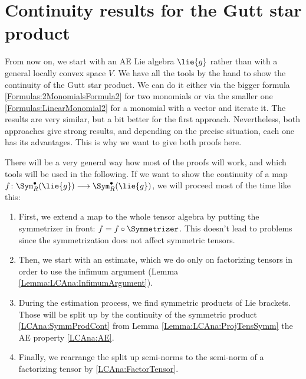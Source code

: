 \section{Continuity results for the Gutt star product}
\label{sec:chap5_TopologyStar}

From now on, we start with an AE Lie algebra $\lie{g}$ rather than with a 
general locally convex space $V$. We have all the tools by the hand to show the 
continuity of the Gutt star product. We can do it either via the bigger 
formula \eqref{Formulas:2MonomialsFormula2} for two monomials or via the 
smaller one \eqref{Formulas:LinearMonomial2} for a monomial with a 
vector and iterate it. The results are very similar, but a bit better for the 
first approach. Nevertheless, both approaches give strong results, and 
depending on the precise situation, each one has its advantages. This is why 
we want to give both proofs here.

There will be a very general way how most of the proofs will work, and which 
tools will be used in the following. If we want to show the continuity of a 
map $f \colon \Sym_R^{\bullet}(\lie{g}) \longrightarrow 
\Sym_R^{\bullet}(\lie{g})$, we will proceed most of the time like this:
\begin{enumerate}
	\item \label{Item:LCAna:Step1}
	First, we extend a map to the whole tensor algebra by putting the 
	symmetrizer in front: $f = f \circ \Symmetrizer$. This doesn't lead 
	to problems since the symmetrization does not affect symmetric tensors.

	\item \label{Item:LCAna:Step2}
	Then, we start with an estimate, which we do only on 
	factorizing tensors in order to use the infimum argument 
	(Lemma \ref{Lemma:LCAna:InfimumArgument}).

	\item \label{Item:LCAna:Step3}
	During the estimation process, we find symmetric products of Lie 
	brackets. Those will be split up by the continuity of the symmetric 
	product \eqref{LCAna:SymmProdCont} from Lemma 
	\ref{Lemma:LCAna:ProjTensSymm} the AE property \eqref{LCAna:AE}.
	
	\item \label{Item:LCAna:Step4}
	Finally, we rearrange the split up semi-norms to the semi-norm of a 
	factorizing tensor by \eqref{LCAna:FactorTensor}.
\end{enumerate}


